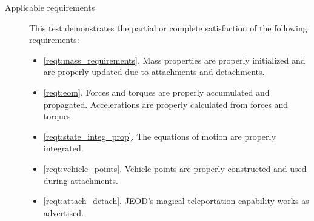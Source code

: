 \begin{description}
\item[Applicable requirements]
This test demonstrates the partial or complete satisfaction of the
following requirements:
\begin{itemize}
\item \ref{reqt:mass_requirements}. Mass properties are properly initialized and
are properly updated due to attachments and detachments.
\item \ref{reqt:eom}. Forces and torques are properly accumulated and
propagated. Accelerations are properly calculated from forces and torques.
\item \ref{reqt:state_integ_prop}. The equations of motion are properly
integrated.
\item \ref{reqt:vehicle_points}. Vehicle points are properly constructed
and used during attachments.
\item \ref{reqt:attach_detach}. JEOD's magical teleportation capability works as
advertised.
\end{itemize}

\end{description}

